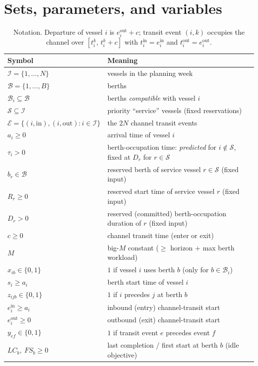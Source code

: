 \documentclass[11pt]{article}
\newcommand{\I}{\mathcal{I}}
\newcommand{\B}{\mathcal{B}}
\newcommand{\Svc}{\mathcal{S}}
\newcommand{\Evt}{\mathcal{E}}
\newcommand{\Bi}{\mathcal{B}_i}
\newcommand{\bigM}{M}
\newcommand{\ein}{e^{\mathrm{in}}}
\newcommand{\eout}{e^{\mathrm{out}}}
\begin{document}
\section{Sets, parameters, and variables}
\begin{table}[h]
\centering
\small
\begin{tabular}{@{}ll@{}}
\toprule
Symbol & Meaning \\
\midrule
$\I=\{1,\dots,N\}$ & vessels in the planning week \\
$\B=\{1,\dots,B\}$ & berths \\
$\Bi\subseteq\B$ & berths \emph{compatible} with vessel $i$ \\
$\Svc\subseteq\I$ & priority ``service'' vessels (fixed reservations) \\
$\Evt=\{(i,\mathrm{in}),(i,\mathrm{out}):i\in\I\}$ & the $2N$ channel transit events \\
\midrule
$a_i\ge 0$ & arrival time of vessel $i$ \\
$\tau_i>0$ & berth-occupation time: \emph{predicted} for $i\notin\Svc$, fixed at $D_r$ for $r\in\Svc$ \\
$b_r\in\B$ & reserved berth of service vessel $r\in\Svc$ \quad(fixed input) \\
$R_r\ge 0$ & reserved start time of service vessel $r$ \quad(fixed input) \\
$D_r>0$ & reserved (committed) berth-occupation duration of $r$ \quad(fixed input) \\
$c\ge 0$ & channel transit time (enter or exit) \\
$\bigM$ & big-$M$ constant ($\ge$ horizon $+$ max berth workload) \\
\midrule
$x_{ib}\in\{0,1\}$ & $1$ if vessel $i$ uses berth $b$ \quad(only for $b\in\Bi$) \\
$s_i\ge a_i$ & berth start time of vessel $i$ \\
$z_{ijb}\in\{0,1\}$ & $1$ if $i$ precedes $j$ at berth $b$ \\
$\ein_i\ge a_i$ & inbound (entry) channel-transit start \\
$\eout_i\ge 0$ & outbound (exit) channel-transit start \\
$y_{ef}\in\{0,1\}$ & $1$ if transit event $e$ precedes event $f$ \\
$\mathit{LC}_b,\ \mathit{FS}_b\ge 0$ & last completion / first start at berth $b$ (idle objective) \\
\bottomrule
\end{tabular}
\caption{Notation. Departure of vessel $i$ is $\eout_i+c$; transit event
$(i,k)$ occupies the channel over $[t_{i}^{k},\,t_{i}^{k}+c]$ with
$t_i^{\mathrm{in}}=\ein_i$ and $t_i^{\mathrm{out}}=\eout_i$.}
\end{table}
\end{document}
